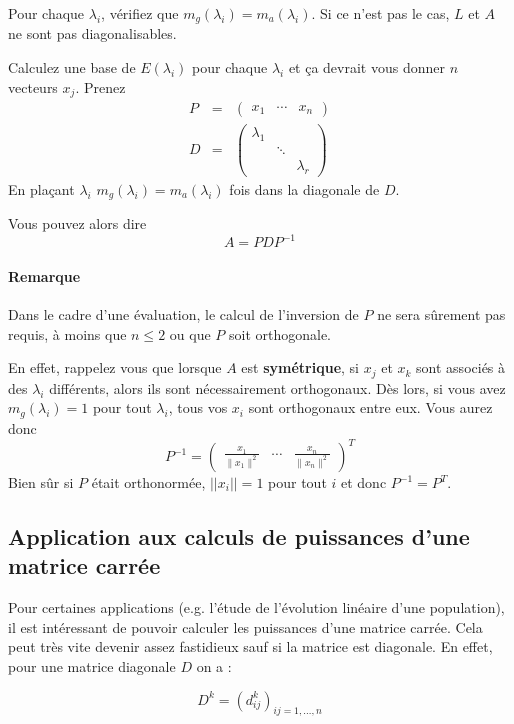 Pour chaque $\lambda_i$, vérifiez que $m_g(\lambda_i) = m_a(\lambda_i)$. Si ce n'est pas le cas, $L$ et $A$ ne sont pas diagonalisables.

Calculez une base de $E(\lambda_i)$ pour chaque $\lambda_i$ et ça devrait vous donner $n$ vecteurs $x_j$.
Prenez
\begin{eqnarray*}
	P &=& \begin{pmatrix}x_1 & \cdots & x_n\end{pmatrix}\\
	D &=&
	\begin{pmatrix}
		\lambda_1 & &\\
		&\ddots&\\
		&&\lambda_r
	\end{pmatrix}
\end{eqnarray*}
En plaçant $\lambda_i$ $m_g(\lambda_i) = m_a(\lambda_i)$
fois dans la diagonale de $D$.

Vous pouvez alors dire
\[ A = PDP^{-1} \]

\paragraph{Remarque}
Dans le cadre d'une évaluation, le calcul de l'inversion de $P$ ne sera sûrement pas requis, à moins que $n \leq 2$ ou que $P$ soit orthogonale.

En effet, rappelez vous que lorsque $A$ est \textbf{symétrique}, si $x_j$ et $x_k$ sont associés à des $\lambda_i$ différents, alors ils sont nécessairement orthogonaux.
Dès lors, si vous avez $m_g(\lambda_i) = 1$ pour tout $\lambda_i$, tous vos $x_i$ sont orthogonaux entre eux.
Vous aurez donc
\[
  P^{-1} =
  \begin{pmatrix}
    \frac{x_1}{\|x_1\|^2} & \cdots & \frac{x_n}{\|x_n\|^2}
  \end{pmatrix}^T
\]
Bien sûr si $P$ était orthonormée, $||x_i|| = 1$ pour tout $i$ et
donc $P^{-1} = P^T$.

\subsection{Application aux calculs de puissances d'une matrice carrée}
Pour certaines applications (e.g. l'étude de l'évolution linéaire d'une population), il est
intéressant de pouvoir calculer les puissances d'une matrice carrée. Cela peut très vite devenir assez fastidieux sauf si
la matrice est diagonale. En effet, pour une matrice diagonale $D$ on a :

$$D^k = (d^k_{ij})_{ij = 1, \dots, n}$$


